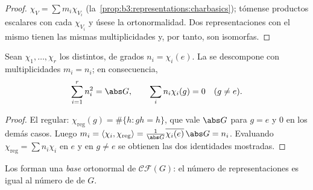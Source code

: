 \begin{proof}
$\chi_V = \sum m_i\chi_{V_i}$
(la~\cref{prop:b3:representations:charbasics}); tómense productos
escalares con cada $\chi_{V_i}$ y úsese la ortonormalidad. Dos
representaciones con el mismo
 tienen las mismas
multiplicidades y, por tanto, son isomorfas.
\end{proof}

\begin{theorem}
\label{thm:b3:representations:regular}
Sean $\chi_1, \dots, \chi_r$ los
 distintos, de grados
$n_i = \chi_i(e)$. La
 se
descompone con multiplicidades $m_i = n_i$; en consecuencia,
\[
\sum_{i=1}^{r} n_i^2 = \abs G,
\qquad
\sum_i n_i\chi_i(g) = 0 \quad (g \neq e).
\]
\end{theorem}

\begin{proof}
El  regular:
$\chi_{\mathrm{reg}}(g) =
\#\{h : gh = h\}$, que vale $\abs G$ para $g = e$ y $0$ en los demás
casos. Luego $m_i = \langle \chi_i,\chi_{\mathrm{reg}}\rangle =
\frac1{\abs G}\overline{\chi_i(e)}\,\abs G = n_i$. Evaluando
$\chi_{\mathrm{reg}} = \sum n_i\chi_i$ en $e$ y en $g \neq e$ se
obtienen las dos identidades mostradas.
\end{proof}

\begin{theorem}\label{thm:b3:representations:numberirr}
Los 
 forman una \emph{base}
ortonormal de $\mathcal{CF}(G)$: el número de
representaciones  es
igual al número de 
de $G$.
\end{theorem}

